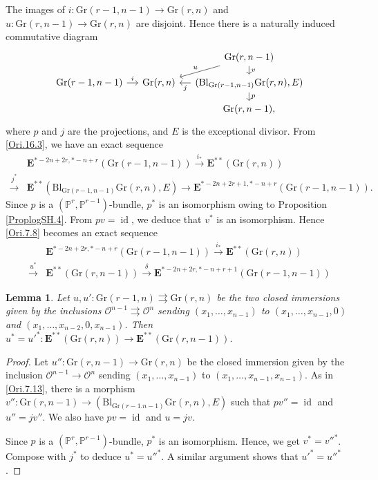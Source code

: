 \documentclass[11pt, a4paper]{amsart}
\newtheorem{lem}[thm]{Lemma}
\theoremstyle{definition}
\numberwithin{equation}{subsection}
\renewcommand{\P}{\mathbb{P}}
\newcommand{\id}{\operatorname{id}}   			%
\newcommand{\Blow}{{\mathrm{Bl}}}
\newcommand{\Gr}{{\mathrm{Gr}}}
\newcommand{\cO}{\mathcal{O}}
\newcommand{\ringE}{\mathbf{E}}
\begin{document}
The images of $i\colon \Gr(r-1,n-1)\to \Gr(r,n)$ and $u\colon \Gr(r,n-1)\to \Gr(r,n)$ are disjoint.
Hence there is a naturally induced commutative diagram
\begin{equation}
\label{Ori.7.13}
\begin{tikzcd}[column sep=small, row sep=small]
&& \Gr(r,n-1)\ar[d,"v"]\ar[ld,"u"']
\\
\Gr(r-1,n-1)\ar[r,"i"]&
\Gr(r,n)\ar[r,leftarrow,"j"']&
(\Blow_{\Gr(r-1,n-1)}\Gr(r,n),E)\ar[d,"p"]
\\
&& \Gr(r,n-1),
\end{tikzcd}
\end{equation}
where $p$ and $j$ are the projections, and $E$ is the exceptional divisor.
From \eqref{Ori.16.3}, we have an exact sequence
\begin{equation}
\label{Ori.7.8}
\begin{split}
&\ringE^{*-2n+2r,*-n+r}(\Gr(r-1,n-1))
\xrightarrow{i_*}
\ringE^{**}(\Gr(r,n))
\\
\xrightarrow{j^*}
&\ringE^{**}(\Blow_{\Gr(r-1,n-1)}\Gr(r,n),E)
\to
\ringE^{*-2n+2r+1,*-n+r}(\Gr(r-1,n-1)).
\end{split}
\end{equation}
Since $p$ is a $(\P^r,\P^{r-1})$-bundle, $p^*$ is an isomorphism owing to Proposition \ref{ProplogSH.4}.
From $pv=\id$, we deduce that $v^*$ is an isomorphism.
Hence \eqref{Ori.7.8} becomes an exact sequence
\begin{equation}
\label{Ori.7.9}
\begin{split}
&\ringE^{*-2n+2r,*-n+r}(\Gr(r-1,n-1))
\xrightarrow{i_*}
\ringE^{**}(\Gr(r,n))
\\
\xrightarrow{u^*}
&\ringE^{**}(\Gr(r,n-1))
\xrightarrow{\delta}
\ringE^{*-2n+2r,*-n+r+1}(\Gr(r-1,n-1))
\end{split}
\end{equation}


\begin{lem}
\label{Ori.28}
Let $u,u'\colon \Gr(r-1,n)\rightrightarrows \Gr(r,n)$ be the two closed immersions given by the inclusions 
$\cO^{n-1}\rightrightarrows \cO^n$ sending $(x_1,\ldots,x_{n-1})$ to $(x_1,\ldots,x_{n-1},0)$ and 
$(x_1,\ldots,x_{n-2},0,x_{n-1})$.
Then $u^*=u'^*\colon \ringE^{**}(\Gr(r,n))\to \ringE^{**}(\Gr(r,n-1))$.
\end{lem}
\begin{proof}
Let $u''\colon \Gr(r,n-1)\rightarrow \Gr(r,n)$ be the closed immersion given by 
the inclusion $\cO^{n-1}\to \cO^n$ 
sending $(x_1,\ldots,x_{n-1})$ to $(x_1,\ldots,x_{n-1},x_{n-1})$.
As in \eqref{Ori.7.13}, 
there is a morphism $v''\colon \Gr(r,n-1)\to (\Blow_{\Gr(r-1.n-1)}\Gr(r,n),E)$ such that $pv''=\id$ and $u''=jv''$.
We also have $pv=\id$ and $u=jv$.

Since $p$ is a $(\P^r,\P^{r-1})$-bundle, $p^*$ is an isomorphism.
Hence, we get $v^*=v''^*$.
Compose with $j^*$ to deduce $u^*=u''^*$.
A similar argument shows that $u'^*=u''^*$.
\end{proof}
\end{document}
